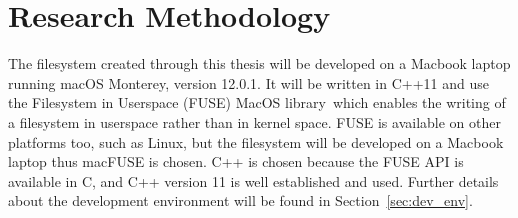 
\section{Research Methodology}%

The filesystem created through this thesis will be developed on a Macbook laptop running macOS Monterey, version 12.0.1. It will be written in C++11 and use the Filesystem in Userspace (FUSE) MacOS library\,\cite{HomeMacFUSE} which enables the writing of a filesystem in userspace rather than in kernel space. FUSE is available on other platforms too, such as Linux, but the filesystem will be developed on a Macbook laptop thus macFUSE is chosen. C++ is chosen because the FUSE API is available in C, and C++ version 11 is well established and used. Further details about the development environment will be found in Section~\ref{sec:dev_env}.

